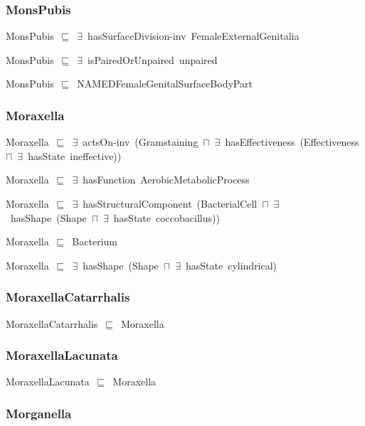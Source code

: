 \documentclass{article}
\begin{document}
\subsubsection*{MonsPubis}

MonsPubis~\ensuremath{\sqsubseteq}~\ensuremath{\exists}~hasSurfaceDivision-inv~FemaleExternalGenitalia~

MonsPubis~\ensuremath{\sqsubseteq}~\ensuremath{\exists}~isPairedOrUnpaired~unpaired~

MonsPubis~\ensuremath{\sqsubseteq}~NAMEDFemaleGenitalSurfaceBodyPart~

\subsubsection*{Moraxella}

Moraxella~\ensuremath{\sqsubseteq}~\ensuremath{\exists}~actsOn-inv~(Gramstaining~\ensuremath{\sqcap}~\ensuremath{\exists}~hasEffectiveness~(Effectiveness~\ensuremath{\sqcap}~\ensuremath{\exists}~hasState~ineffective))~

Moraxella~\ensuremath{\sqsubseteq}~\ensuremath{\exists}~hasFunction~AerobicMetabolicProcess~

Moraxella~\ensuremath{\sqsubseteq}~\ensuremath{\exists}~hasStructuralComponent~(BacterialCell~\ensuremath{\sqcap}~\ensuremath{\exists}~hasShape~(Shape~\ensuremath{\sqcap}~\ensuremath{\exists}~hasState~coccobacillus))~

Moraxella~\ensuremath{\sqsubseteq}~Bacterium~

Moraxella~\ensuremath{\sqsubseteq}~\ensuremath{\exists}~hasShape~(Shape~\ensuremath{\sqcap}~\ensuremath{\exists}~hasState~cylindrical)~

\subsubsection*{MoraxellaCatarrhalis}

MoraxellaCatarrhalis~\ensuremath{\sqsubseteq}~Moraxella~

\subsubsection*{MoraxellaLacunata}

MoraxellaLacunata~\ensuremath{\sqsubseteq}~Moraxella~

\subsubsection*{Morganella}
\end{document}
